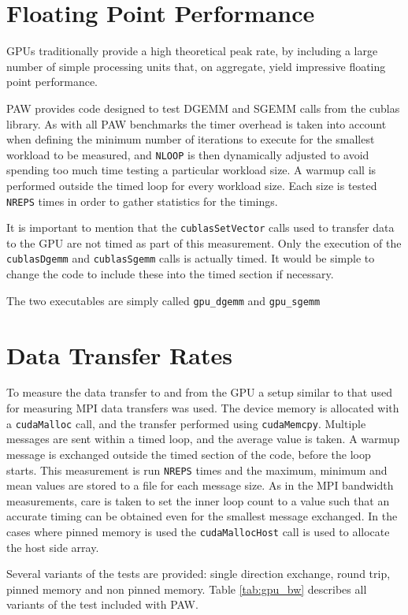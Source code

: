 \documentclass[10pt,a4paper]{report}
\begin{document}
\section{Floating Point Performance}
\label{sec:gpu_fp}
GPUs traditionally provide a high theoretical peak rate, by including a large number of simple processing units that, on aggregate, yield impressive floating point performance.

PAW provides code designed to test DGEMM and SGEMM calls from the cublas library. As with all PAW benchmarks the timer overhead is taken into account when defining the minimum number of iterations to execute for the smallest workload to be measured, and \verb+NLOOP+ is then dynamically adjusted to avoid spending too much time testing a particular workload size. A warmup call is performed outside the timed loop for every workload size. Each size is tested \verb+NREPS+ times in order to gather statistics for the timings.

It is important to mention that the \verb+cublasSetVector+ calls used to transfer data to the GPU are not timed as part of this measurement. Only the execution of the \verb+cublasDgemm+ and \verb+cublasSgemm+ calls is actually timed. It would be simple to change the code to include these into the timed section if necessary.

The two executables are simply called \verb+gpu_dgemm+ and \verb+gpu_sgemm+


\section{Data Transfer Rates}
\label{sec:gpu_bw}
To measure the data transfer to and from the GPU a setup similar to that used for measuring MPI data transfers was used. The device memory is allocated with a \verb+cudaMalloc+ call, and the transfer performed using \verb+cudaMemcpy+. Multiple messages are sent within a timed loop, and the average value is taken. A warmup message is exchanged outside the timed section of the code, before the loop starts. This measurement is run \verb+NREPS+ times and the maximum, minimum and mean values are stored to a file for each message size. As in the MPI bandwidth measurements, care is taken to set the inner loop count to a value such that an accurate timing can be obtained even for the smallest message exchanged. In the cases where pinned memory is used the \verb+cudaMallocHost+ call is used to allocate the host side array.

Several variants of the tests are provided: single direction exchange, round trip, pinned memory and non pinned memory. Table \ref{tab:gpu_bw} describes all variants of the test included with PAW.
\end{document}
